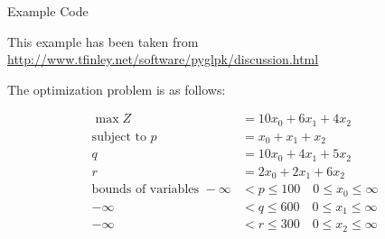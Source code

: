 \documentclass[12pt]{article}
\begin{document}
\begin{Large}
Example Code
\end{Large}

\vspace{1cm}

This example has been taken from \\ \url{http://www.tfinley.net/software/pyglpk/discussion.html}


The optimization problem is as follows:

\begin{align*}
\max Z &= 10 x_0 + 6 x_1 + 4 x_2 \\
\text{subject to }p &= x_0 + x_1  + x_2 \\
q &= 10 x_0 + 4 x_1 + 5 x_2 \\
r &= 2 x_0 + 2 x_1 + 6 x_2 \\
\text{bounds of variables } -\infty &< p \leq 100 \quad 0 \leq x_0 \leq \infty \\
- \infty &< q \leq 600 \quad 0 \leq x_1 \leq \infty \\
- \infty &< r \leq 300 \quad 0 \leq x_2 \leq \infty
\end{align*}
\end{document}
